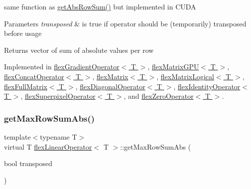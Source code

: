same function as \hyperlink{classflex_linear_operator_ad6caa7b09e6e3c401cadef61b8e2307e}{get\+Abs\+Row\+Sum()} but implemented in C\+U\+DA 


\begin{DoxyParams}{Parameters}
{\em transposed} & is true if operator should be (temporarily) transposed before usage \\
\hline
\end{DoxyParams}
\begin{DoxyReturn}{Returns}
vector of sum of absolute values per row 
\end{DoxyReturn}


Implemented in \hyperlink{classflex_gradient_operator_ac5cf151db87946ac0f1864344db260d5}{flex\+Gradient\+Operator$<$ T $>$}, \hyperlink{classflex_matrix_g_p_u_ab9fceb951d911794d4c70f5045255abd}{flex\+Matrix\+G\+P\+U$<$ T $>$}, \hyperlink{classflex_concat_operator_a76e35865b16975bfcd6431879bda195b}{flex\+Concat\+Operator$<$ T $>$}, \hyperlink{classflex_matrix_ae713d5dabcdab30df9b04f2a7d499235}{flex\+Matrix$<$ T $>$}, \hyperlink{classflex_matrix_logical_a0245c73fb7d1fb3b1900208e0deb48d6}{flex\+Matrix\+Logical$<$ T $>$}, \hyperlink{classflex_full_matrix_af8ade69023e1c5140a82ad3583a8acb6}{flex\+Full\+Matrix$<$ T $>$}, \hyperlink{classflex_diagonal_operator_a71cdb6ea6b8b7ceabaf538a180c8dcf4}{flex\+Diagonal\+Operator$<$ T $>$}, \hyperlink{classflex_identity_operator_ae12ebab61f7f39b0d1f636ad1d27c77a}{flex\+Identity\+Operator$<$ T $>$}, \hyperlink{classflex_superpixel_operator_ae2f878d68c4574a0d5f21ffd132afc63}{flex\+Superpixel\+Operator$<$ T $>$}, and \hyperlink{classflex_zero_operator_ad63f43f4b1abe71779e5b0ee364b93d1}{flex\+Zero\+Operator$<$ T $>$}.

\mbox{\label{classflex_linear_operator_afcb74697385ccb7c8d29870d7034c12a}} 
\subsubsection{\texorpdfstring{get\+Max\+Row\+Sum\+Abs()}{getMaxRowSumAbs()}}
{\footnotesize\ttfamily template$<$typename T$>$ \\
virtual T \hyperlink{classflex_linear_operator}{flex\+Linear\+Operator}$<$ T $>$\+::get\+Max\+Row\+Sum\+Abs (\begin{DoxyParamCaption}\item[{bool}]{transposed }\end{DoxyParamCaption})\hspace{0.3cm}{\ttfamily [pure virtual]}}



